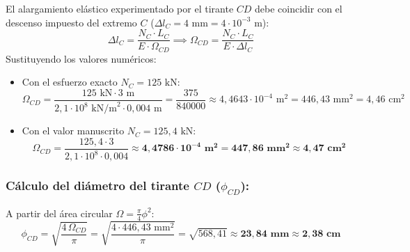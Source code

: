 
El alargamiento elástico experimentado por el tirante $CD$ debe coincidir con el descenso impuesto del extremo $C$ ($\Delta l_C = 4\text{ mm} = 4 \cdot 10^{-3}\text{ m}$):
\begin{equation}
    \Delta l_C = \frac{N_C \cdot L_C}{E \cdot \Omega_{CD}} \implies \Omega_{CD} = \frac{N_C \cdot L_C}{E \cdot \Delta l_C}
\end{equation}
Sustituyendo los valores numéricos:
\begin{itemize}
    \item Con el esfuerzo exacto $N_C = 125\text{ kN}$:
          \begin{equation}
              \Omega_{CD} = \frac{125\text{ kN} \cdot 3\text{ m}}{2{,}1 \cdot 10^8\text{ kN/m}^2 \cdot 0{,}004\text{ m}} = \frac{375}{840000} \approx \boxed{4{,}4643 \cdot 10^{-4}\text{ m}^2 = 446{,}43\text{ mm}^2 = 4{,}46\text{ cm}^2}
          \end{equation}
    \item Con el valor manuscrito $N_C = 125{,}4\text{ kN}$:
          \begin{equation}
              \Omega_{CD} = \frac{125{,}4 \cdot 3}{2{,}1 \cdot 10^8 \cdot 0{,}004} \approx \mathbf{4{,}4786 \cdot 10^{-4}\text{ m}^2 = 447{,}86\text{ mm}^2 \approx 4{,}47\text{ cm}^2}
          \end{equation}
\end{itemize}

\subsubsection*{Cálculo del diámetro del tirante $CD$ ($\phi_{CD}$):}
A partir del área circular $\Omega = \frac{\pi}{4}\phi^2$:
\begin{equation}
    \phi_{CD} = \sqrt{\frac{4\,\Omega_{CD}}{\pi}} = \sqrt{\frac{4 \cdot 446{,}43\text{ mm}^2}{\pi}} = \sqrt{568{,}41} \approx \mathbf{23{,}84\text{ mm}} \approx \mathbf{2{,}38\text{ cm}}
\end{equation}

